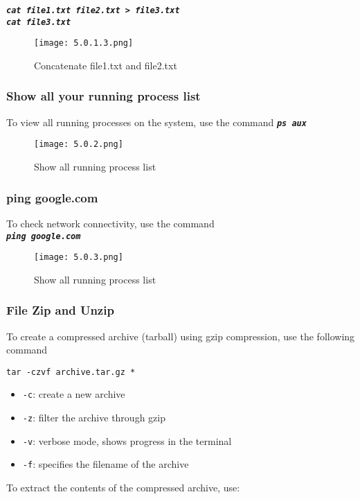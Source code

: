 \documentclass[12pt]{article}
\begin{document}
\noindent
\textbf{\textit{\texttt{cat file1.txt file2.txt > file3.txt}}}\\
\textbf{\textit{\texttt{cat file3.txt}}}
\begin{figure}[H] %
    \centering
    \texttt{[image: 5.0.1.3.png]}
    \caption{Concatenate file1.txt and file2.txt}
    \label{kaniz 5.0.1.3}
\end{figure}

\subsubsection{Show all your running process list}
To view all running processes on the system, use the command
\textbf{\textit{\texttt{ps aux}}}
\begin{figure}[H] %
    \centering
    \texttt{[image: 5.0.2.png]}
    \caption{Show all running process list}
    \label{kaniz 5.0.2}
\end{figure}

\subsubsection{ping google.com}
To check network connectivity, use the command\\
\textbf{\textit{\texttt{ping google.com}}}
\begin{figure}[H] %
    \centering
    \texttt{[image: 5.0.3.png]}
    \caption{Show all running process list}
    \label{kaniz 5.0.3}
\end{figure}

\subsubsection{File Zip and Unzip}
To create a compressed archive (tarball) using gzip compression, use the following command
\begin{verbatim}
tar -czvf archive.tar.gz *
\end{verbatim}

\begin{itemize}
  \item \texttt{-c}: create a new archive
  \item \texttt{-z}: filter the archive through gzip
  \item \texttt{-v}: verbose mode, shows progress in the terminal
  \item \texttt{-f}: specifies the filename of the archive
\end{itemize}
To extract the contents of the compressed archive, use:
\end{document}
